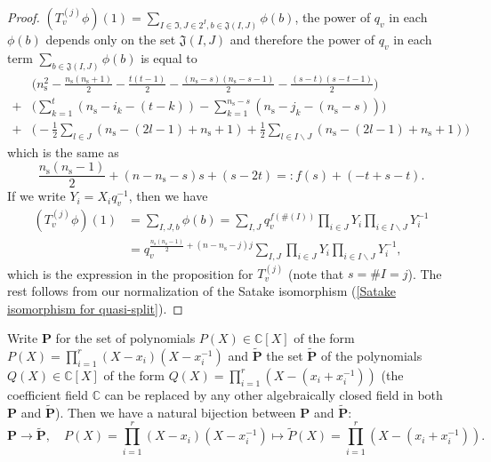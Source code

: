 \documentclass[12pt,oneside,reqno]{amsart}
\theoremstyle{plain}
\begin{document}
\begin{proof}
		$(T_v^{(j)}\phi)(1)
		=
		\sum_{I\in\mathfrak{I},J\in 2^I,b\in\mathfrak{J}(I,J)}
		\phi(b)$,
		the power of $q_v$ in each
		$\phi(b)$
		depends only on the set
		$\mathfrak{J}(I,J)$
		and therefore
		the power of
		$q_v$ in each term
		$\sum_{b\in\mathfrak{J}(I,J)}
		\phi(b)$
		is equal to
		\begin{align*}
			&
			\bigg(
			n_\mathrm{s}^2
			-\frac{n_\mathrm{s}(n_\mathrm{s}+1)}{2}
			-\frac{t(t-1)}{2}
			-\frac{(n_\mathrm{s}-s)(n_\mathrm{s}-s-1)}{2}
			-\frac{(s-t)(s-t-1)}{2}
			\bigg)
			\\
			+
			&
			\bigg(
			\sum_{k=1}^t
			(n_\mathrm{s}-i_k-(t-k))
			-
			\sum_{k=1}^{n_\mathrm{s}-s}
			(n_\mathrm{s}-j_k-(n_\mathrm{s}-s))
			\bigg)
			\\
			+
			&
			\bigg(
			-\frac{1}{2}\sum_{l\in J}(n_\mathrm{s}-(2l-1)+n_\mathrm{s}+1)
			+
			\frac{1}{2}\sum_{l\in I\backslash J}(n_\mathrm{s}-(2l-1)+n_\mathrm{s}+1)
			\bigg)
		\end{align*}
		which is the same as
		\[
		\frac{n_\mathrm{s}(n_\mathrm{s}-1)}{2}
		+
		(n-n_\mathrm{s}-s)s
		+
		(s-2t)
		=:
		f(s)+
		(-t+s-t).
		\]
		If we write
		$Y_i=X_iq_v^{-1}$,
		then we have
		\begin{align*}
			(T_v^{(j)}\phi)(1)
			&
			=
			\sum_{I,J,b}
			\phi(b)
			=
			\sum_{I,J}
			q_v^{f(\# (I))}
			\prod_{i\in J}Y_i
			\prod_{i\in I\backslash J}Y_i^{-1}
			\\
			&
			=
			q_v^{\frac{n_\mathrm{s}(n_\mathrm{s}-1)}{2}
				+
				(n-n_\mathrm{s}-j)j}
			\sum_{I,J}
			\prod_{i\in J}Y_i
			\prod_{i\in I\backslash J}Y_i^{-1},
		\end{align*}
		which is the expression in the proposition for
		$T_v^{(j)}$
		(note that $s=\#  I=j$).
		The rest follows from our normalization of
		the Satake isomorphism
		(\ref{Satake isomorphism for quasi-split}).
	\end{proof}
	
	
	
	Write $\mathbf{P}$ for the set of polynomials $P(X)\in\mathbb{C}[X]$ of the form $P(X)=\prod_{i=1}^r(X-x_i)(X-x_i^{-1})$ and $\widetilde{\mathbf{P}}$ the set $\widetilde{\mathbf{P}}$ of the polynomials $Q(X)\in\mathbb{C}[X]$
	of the form $Q(X)=\prod_{i=1}^r(X-(x_i+x_i^{-1}))$ (the coefficient field $\mathbb{C}$ can be replaced by any other algebraically closed field in both $\mathbf{P}$ and $\widetilde{\mathbf{P}}$). Then we have a natural bijection between $\mathbf{P}$ and $\widetilde{\mathbf{P}}$:
	\begin{equation}\label{degree 1 and 2 polynomials}
		\mathbf{P}
		\rightarrow
		\widetilde{\mathbf{P}},
		\quad
		P(X)=\prod_{i=1}^r(X-x_i)(X-x_i^{-1})
		\mapsto
		\widetilde{P}(X)=\prod_{i=1}^r(X-(x_i+x_i^{-1})).
	\end{equation}
	
\end{document}

